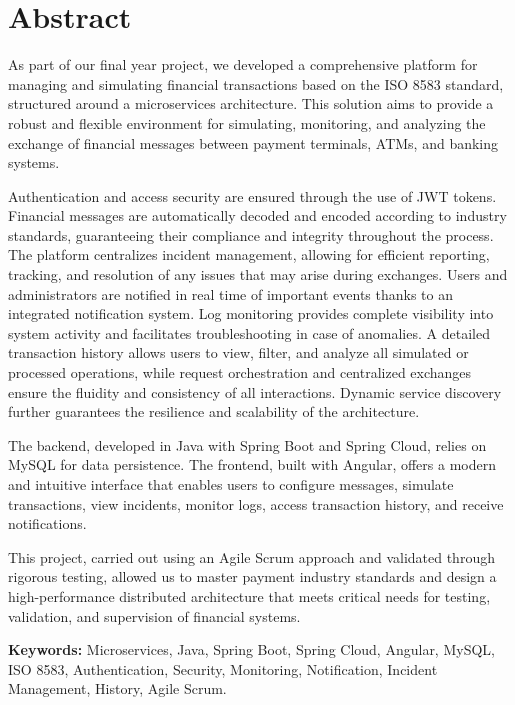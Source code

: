 \chapter*{Abstract}
\justifying

As part of our final year project, we developed a comprehensive platform for managing and simulating financial transactions based on the ISO 8583 standard, structured around a microservices architecture. This solution aims to provide a robust and flexible environment for simulating, monitoring, and analyzing the exchange of financial messages between payment terminals, ATMs, and banking systems.

Authentication and access security are ensured through the use of JWT tokens. Financial messages are automatically decoded and encoded according to industry standards, guaranteeing their compliance and integrity throughout the process. The platform centralizes incident management, allowing for efficient reporting, tracking, and resolution of any issues that may arise during exchanges. Users and administrators are notified in real time of important events thanks to an integrated notification system. Log monitoring provides complete visibility into system activity and facilitates troubleshooting in case of anomalies. A detailed transaction history allows users to view, filter, and analyze all simulated or processed operations, while request orchestration and centralized exchanges ensure the fluidity and consistency of all interactions. Dynamic service discovery further guarantees the resilience and scalability of the architecture.

The backend, developed in Java with Spring Boot and Spring Cloud, relies on MySQL for data persistence. The frontend, built with Angular, offers a modern and intuitive interface that enables users to configure messages, simulate transactions, view incidents, monitor logs, access transaction history, and receive notifications.

This project, carried out using an Agile Scrum approach and validated through rigorous testing, allowed us to master payment industry standards and design a high-performance distributed architecture that meets critical needs for testing, validation, and supervision of financial systems.

\vspace{0.4cm}
\noindent \textbf{Keywords:} Microservices, Java, Spring Boot, Spring Cloud, Angular, MySQL, ISO 8583, Authentication, Security, Monitoring, Notification, Incident Management, History, Agile Scrum.
